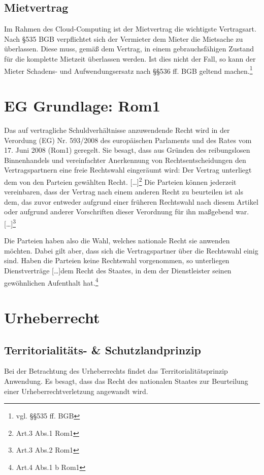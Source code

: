 \subsection{Mietvertrag}
Im Rahmen des Cloud-Computing ist der Mietvertrag die wichtigste Vertragsart.\newline
Nach §535 BGB verpflichtet sich der Vermieter dem Mieter die Mietsache zu \"uberlassen. Diese muss, gem\"a{\ss} dem Vertrag, in einem gebrauchsf\"ahigen Zustand f\"ur die komplette Mietzeit \"uberlassen werden. Ist dies nicht der Fall, so kann der Mieter Schadens- und Aufwendungsersatz nach §§536 ff. BGB geltend machen.\footnote{vgl.  §§535 ff. BGB}
  \label{mietvertrag}

\section{EG Grundlage: Rom1}
Das auf vertragliche Schuldverh\"altnisse anzuwendende Recht wird in der  {\glqq}Verordung (EG) Nr. 593/2008 des europ\"aischen Parlaments und des Rates vom 17. Juni 2008 (Rom1){\grqq} geregelt. Sie besagt, dass aus Gr\"unden des reibungslosen Binnenhandels und vereinfachter Anerkennung von Rechtsentscheidungen den Vertragspartnern eine freie Rechtswahl einger\"aumt wird:{\glqq} Der Vertrag unterliegt dem von den Parteien gew\"ahlten Recht. […]{\grqq}\footnote{Art.3 Abs.1 Rom1}
\newline
{\glqq}Die Parteien k\"onnen jederzeit vereinbaren, dass der Vertrag nach einem anderen Recht zu beurteilen ist als dem, das zuvor entweder aufgrund einer fr\"uheren Rechtswahl nach diesem Artikel oder aufgrund anderer Vorschriften dieser Verordnung f\"ur ihn ma{\ss}gebend war. […]{\grqq}\footnote{Art.3 Abs.2 Rom1}\newline

Die Parteien haben also die Wahl, welches nationale Recht sie anwenden m\"ochten. Dabei gilt aber, dass sich die Vertragspartner \"uber die Rechtswahl einig sind. Haben die Parteien keine Rechtswahl vorgenommen, so unterliegen Dienstvertr\"age {\glqq}[…]dem Recht des Staates, in dem der Dienstleister seinen gew\"ohnlichen Aufenthalt hat.{\grqq}\footnote{Art.4 Abs.1 b Rom1}

\section{Urheberrecht}
\subsection{Territorialit\"ats- \& Schutzlandprinzip}
Bei der Betrachtung des Urheberrechts findet das Territorialit\"atsprinzip Anwendung. Es besagt, dass das Recht des nationalen Staates zur Beurteilung einer Urheberrechtverletzung angewandt wird.\newline

